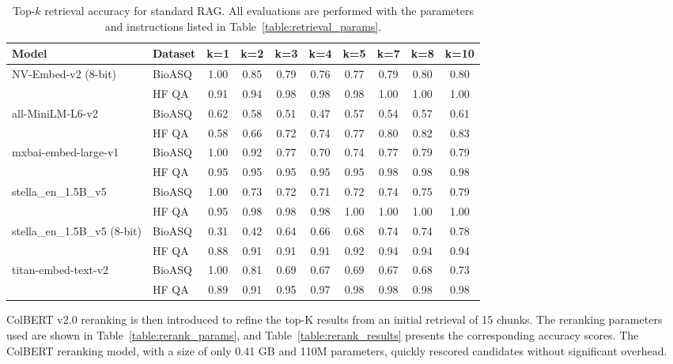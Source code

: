 \documentclass{scrartcl}
\begin{document}
\begin{table}[H]
\centering
\small
\begin{tabular}{l l c c c c c c c c}
\hline
\textbf{Model} & \textbf{Dataset} & \textbf{k=1} & \textbf{k=2} & \textbf{k=3} & \textbf{k=4} & \textbf{k=5} & \textbf{k=7} & \textbf{k=8} & \textbf{k=10} \\
\hline
\multirow{2}{*}{NV-Embed-v2 (8-bit)} 
 & BioASQ & 1.00 & 0.85 & 0.79 & 0.76 & 0.77 & 0.79 & 0.80 & 0.80 \\
 & HF QA  & 0.91 & 0.94 & 0.98 & 0.98 & 0.98 & 1.00 & 1.00 & 1.00 \\
\hline
\multirow{2}{*}{all-MiniLM-L6-v2} 
 & BioASQ & 0.62 & 0.58 & 0.51 & 0.47 & 0.57 & 0.54 & 0.57 & 0.61 \\
 & HF QA  & 0.58 & 0.66 & 0.72 & 0.74 & 0.77 & 0.80 & 0.82 & 0.83 \\
\hline
\multirow{2}{*}{mxbai-embed-large-v1} 
 & BioASQ & 1.00 & 0.92 & 0.77 & 0.70 & 0.74 & 0.77 & 0.79 & 0.79 \\
 & HF QA  & 0.95 & 0.95 & 0.95 & 0.95 & 0.95 & 0.98 & 0.98 & 0.98 \\
\hline
\multirow{2}{*}{stella\_en\_1.5B\_v5} 
 & BioASQ & 1.00 & 0.73 & 0.72 & 0.71 & 0.72 & 0.74 & 0.75 & 0.79 \\
 & HF QA  & 0.95 & 0.98 & 0.98 & 0.98 & 1.00 & 1.00 & 1.00 & 1.00 \\
\hline
\multirow{2}{*}{stella\_en\_1.5B\_v5 (8-bit)} 
 & BioASQ & 0.31 & 0.42 & 0.64 & 0.66 & 0.68 & 0.74 & 0.74 & 0.78 \\
 & HF QA  & 0.88 & 0.91 & 0.91 & 0.91 & 0.92 & 0.94 & 0.94 & 0.94 \\
\hline
\multirow{2}{*}{titan-embed-text-v2} 
 & BioASQ & 1.00 & 0.81 & 0.69 & 0.67 & 0.69 & 0.67 & 0.68 & 0.73 \\
 & HF QA  & 0.89 & 0.91 & 0.95 & 0.97 & 0.98 & 0.98 & 0.98 & 0.98 \\
\hline
\end{tabular}
\caption{Top-$k$ retrieval accuracy for standard RAG. All evaluations are performed with the parameters and instructions listed in Table~\ref{table:retrieval_params}.}
\label{table:standard_rag_results}
\end{table}

ColBERT v2.0 reranking is then introduced to refine the top-K results from an initial retrieval of 15 chunks. The reranking parameters used are shown in Table~\ref{table:rerank_params}, and Table~\ref{table:rerank_results} presents the corresponding accuracy scores. The ColBERT reranking model, with a size of only 0.41 GB and 110M parameters, quickly rescored candidates without significant overhead.
\end{document}
